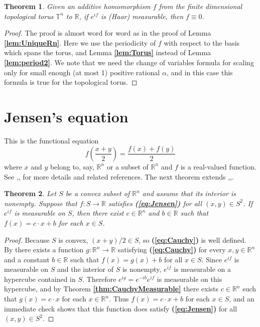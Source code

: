 \documentclass[12 pt]{amsart}
\newtheorem{thm}{Theorem}[section]
\theoremstyle{definition}
\newcommand{\R}{\mathbb{R}}
\newcommand{\T}{\mathbb{T}}
\newcommand{\bref}[1]{\textbf{\ref{#1}}} %
\newcommand{\beqref}[1]{\textbf{(\ref{#1})}} %
\begin{document}
\begin{thm}\label{thm:CauchyTorus}
Given an additive  homomorphism $f$ from the finite dimensional topological torus $\T^n$ to $\R$, if $e^{if}$ is (Haar) measurable, then $f\equiv 0$.
\end{thm}
\begin{proof}
The proof is almost word for word as in the proof of Lemma \bref{lem:UniqueRn}. Here we use the periodicity of $f$ with respect to the  basis which spans the torus, and Lemma \bref{lem:Torus} instead of  Lemma \bref{lem:period2}. We note that we need the change of variables formula for scaling only for small enough (at most 1) positive rational $\alpha$, and in this case this formula is true for the topological torus.
\end{proof}




\section{Jensen's equation}\label{sec:Jensen}
This is the functional equation
\begin{equation}\label{eq:Jensen}
f\left(\frac{x+y}{2}\right)=\frac{f(x)+f(y)}{2}
\end{equation}
where $x$ and $y$ belong to, say, $\R^n$ or a subset of $\R^n$ and $f$ is a real-valued function.  
See \cite[pp. 43--48]{Aczel},\cite[pp. 242--243]{AczelDhombres},\cite[pp. 351--354]{Kuczma2009book} for more 
details and related references. 
The next theorem extends \cite[Theorem 1, p. 46]{Aczel},\cite[Proposition 3, p. 243]{AczelDhombres},\cite[Theorem 13.2.3, p. 354]{Kuczma2009book}.
\begin{thm}\label{thm:Jensen}
Let $S$ be a convex subset of $\R^n$ and assume that its interior is nonempty. 
Suppose that $f:S\to\R$ satisfies \beqref{eq:Jensen} for all $(x,y)\in S^2$.  
If $e^{if}$ is measurable on $S$, then there exist $c\in\R^n$ and $b\in\R$ 
such that $f(x)=c\cdot x+b$ for each $x\in S$. 
\end{thm}
\begin{proof}
Because $S$ is convex, $(x+y)/2\in S$, so \beqref{eq:Cauchy} is well defined. By \cite[Theorem 13.2.1, p. 353]{Kuczma2009book} there exists a function $g:\R^n\to\R$ satisfying \beqref{eq:Cauchy} for every $x,y\in\R^n$ and a constant $b\in \R$ such that $f(x)=g(x)+b$ for all $x\in S$. 
Since $e^{if}$ is measurable on $S$ and the interior of $S$ is nonempty, 
$e^{if}$ is measurable on a hypercube contained in $S$. Therefore $e^{ig}=e^{-ib}e^{if}$ 
is measurable on this hypercube, and by Theorem \bref{thm:CauchyMeasurable} 
there exists $c\in\R^n$ such that $g(x)=c\cdot x$ for each $x\in\R^n$. 
Thus $f(x)=c\cdot x+b$ for each $x\in S$, and an immediate check shows that 
this function does satisfy \beqref{eq:Jensen} for all $(x,y)\in S^2$. 
\end{proof}
\end{document}

